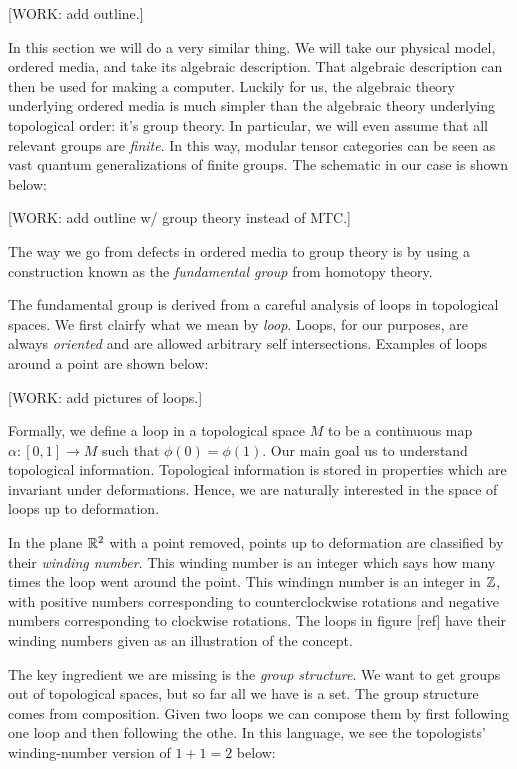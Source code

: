 [WORK: add outline.]

In this section we will do a very similar thing. We will take our physical model, ordered media, and take its algebraic description. That algebraic description can then be used for making a computer. Luckily for us, the algebraic theory underlying ordered media is much simpler than the algebraic theory underlying topological order: it's group theory. In particular, we will even assume that all relevant groups are \textit{finite}. In this way, modular tensor categories can be seen as vast quantum generalizations of finite groups. The schematic in our case is shown below:

[WORK: add outline w/ group theory instead of MTC.]

The way we go from defects in ordered media to group theory is by using a construction known as the \textit{fundamental group} from homotopy theory.

The fundamental group is derived from a careful analysis of loops in topological spaces. We first clairfy what we mean by \textit{loop}. Loops, for our purposes, are always \textit{oriented} and are allowed arbitrary self intersections. Examples of loops around a point are shown below:

[WORK: add pictures of loops.]

Formally, we define a loop in a topological space $M$ to be a continuous map $\alpha:[0,1]\to M$ such that $\phi(0)=\phi(1)$. Our main goal us to understand topological information. Topological information is stored in properties which are invariant under deformations. Hence, we are naturally interested in the space of loops up to deformation.

In the plane $\mathbb{R}^2$ with a point removed, points up to deformation are classified by their \textit{winding number}. This winding number is an integer which says how many times the loop went around the point. This windingn number is an integer in $\mathbb{Z}$, with positive numbers corresponding to counterclockwise rotations and negative numbers corresponding to clockwise rotations. The loops in figure [ref] have their winding numbers given as an illustration of the concept.

The key ingredient we are missing is the \textit{group structure}. We want to get groups out of topological spaces, but so far all we have is a set. The group structure comes from composition. Given two loops we can compose them by first following one loop and then following the othe. In this language, we see the topologists' winding-number version of $1+1=2$ below:

